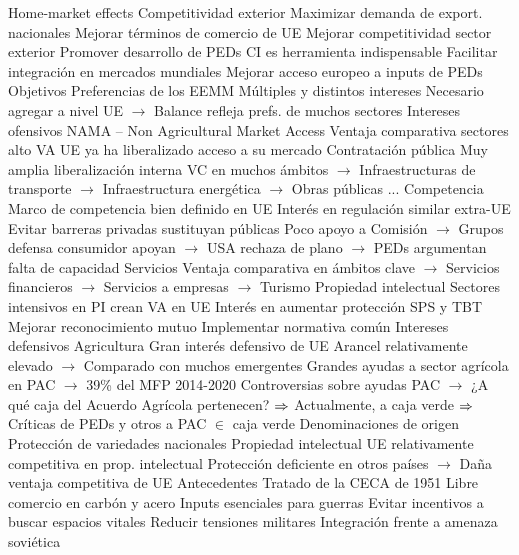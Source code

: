 \documentclass{nuevotema}
\begin{document}
\begin{esquemal}
				\4 Home-market effects
			\3 Competitividad exterior
				\4 Maximizar demanda de export. nacionales
				\4 Mejorar términos de comercio de UE
				\4[$\then$] Mejorar competitividad sector exterior
			\3 Promover desarrollo de PEDs
				\4 CI es herramienta indispensable
				\4 Facilitar integración en mercados mundiales
				\4 Mejorar acceso europeo a inputs de PEDs
		\2 Objetivos
			\3 Preferencias de los EEMM
				\4 Múltiples y distintos intereses
				\4 Necesario agregar a nivel UE
				\4[] $\to$ Balance refleja prefs. de muchos sectores
			\3 Intereses ofensivos
				\4 NAMA -- Non Agricultural Market Access
				\4[] Ventaja comparativa sectores alto VA
				\4[] UE ya ha liberalizado acceso a su mercado
				\4 Contratación pública
				\4[] Muy amplia liberalización interna
				\4[] VC en muchos ámbitos
				\4[] $\to$ Infraestructuras de transporte
				\4[] $\to$ Infraestructura energética
				\4[] $\to$ Obras públicas
				\4[] ...
				\4 Competencia
				\4[] Marco de competencia bien definido en UE
				\4[] Interés en regulación similar extra-UE
				\4[] Evitar barreras privadas sustituyan públicas
				\4[] Poco apoyo a Comisión
				\4[] $\to$ Grupos defensa consumidor apoyan
				\4[] $\to$ USA rechaza de plano
				\4[] $\to$ PEDs argumentan falta de capacidad
				\4 Servicios
				\4[] Ventaja comparativa en ámbitos clave
				\4[] $\to$ Servicios financieros
				\4[] $\to$ Servicios a empresas
				\4[] $\to$ Turismo
				\4 Propiedad intelectual
				\4[] Sectores intensivos en PI crean VA en UE
				\4[] Interés en aumentar protección
				\4 SPS y TBT
				\4[] Mejorar reconocimiento mutuo
				\4[] Implementar normativa común
			\3 Intereses defensivos
				\4 Agricultura
				\4[] Gran interés defensivo de UE
				\4[] Arancel relativamente elevado
				\4[] $\to$ Comparado con muchos emergentes
				\4[] Grandes ayudas a sector agrícola en PAC
				\4[] $\to$ 39\% del MFP 2014-2020
				\4[] Controversias sobre ayudas PAC
				\4[] $\to$ ¿A qué caja del Acuerdo Agrícola pertenecen?
				\4[] $\then$ Actualmente, a caja verde
				\4[] $\then$ Críticas de PEDs y otros a PAC $\in$ caja verde
				\4 Denominaciones de origen
				\4[] Protección de variedades nacionales
				\4 Propiedad intelectual
				\4[] UE relativamente competitiva en prop. intelectual
				\4[] Protección deficiente en otros países
				\4[] $\to$ Daña ventaja competitiva de UE
		\2 Antecedentes
			\3 Tratado de la CECA de 1951
				\4 Libre comercio en carbón y acero
				\4[] Inputs esenciales para guerras
				\4 Evitar incentivos a buscar espacios vitales
				\4 Reducir tensiones militares
				\4 Integración frente a amenaza soviética

\end{esquemal}
\end{document}
